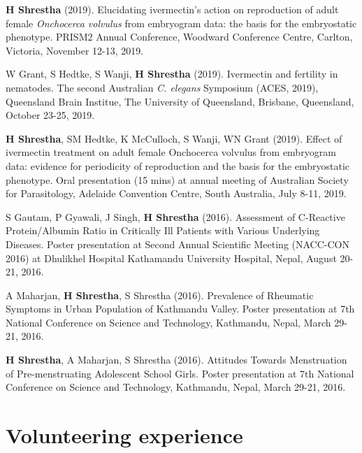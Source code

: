 \documentclass[11pt,a4paper,]{awesome-cv}
\begin{document}
\begin{cventries}
{\begin{cvitems}
\item \textbf{H Shrestha} (2019). Elucidating ivermectin's action on reproduction of adult female \textit{Onchocerca volvulus} from embryogram data: the basis for the embryostatic phenotype. PRISM2 Annual Conference, Woodward Conference Centre, Carlton, Victoria, November 12-13, 2019.
\item W Grant, S Hedtke, S Wanji, \textbf{H Shrestha} (2019). Ivermectin and fertility in nematodes. The second Australian \textit{C. elegans} Symposium (ACES, 2019), Queensland Brain Institue, The University of Queensland, Brisbane, Queensland, October 23-25, 2019.
\item \textbf{H Shrestha}, SM Hedtke, K McCulloch, S Wanji, WN Grant (2019). Effect of ivermectin treatment on adult female Onchocerca volvulus from embryogram data: evidence for periodicity of reproduction and the basis for the embryostatic phenotype. Oral presentation (15 mins) at annual meeting of Australian Society for Parasitology, Adelaide Convention Centre, South Australia, July 8-11, 2019.
\item S Gautam, P Gyawali, J Singh, \textbf{H Shrestha} (2016). Assessment of C-Reactive Protein/Albumin Ratio in Critically Ill Patients with Various Underlying Diseases. Poster presentation at Second Annual Scientific Meeting (NACC-CON 2016) at Dhulikhel Hospital Kathamandu University Hospital, Nepal, August 20-21, 2016.
\item A Maharjan, \textbf{H Shrestha}, S Shrestha (2016). Prevalence of Rheumatic Symptoms in Urban Population of Kathmandu Valley. Poster presentation at 7th National Conference on Science and Technology, Kathmandu, Nepal, March 29-21, 2016.
\item \textbf{H Shrestha}, A Maharjan, S Shrestha (2016). Attitudes Towards Menstruation of Pre-menstruating Adolescent School Girls. Poster presentation at 7th National Conference on Science and Technology, Kathmandu, Nepal, March 29-21, 2016.
\end{cvitems}}
\end{cventries}

\hypertarget{volunteering-experience}{%
\section{Volunteering experience}\label{volunteering-experience}}
\end{document}
